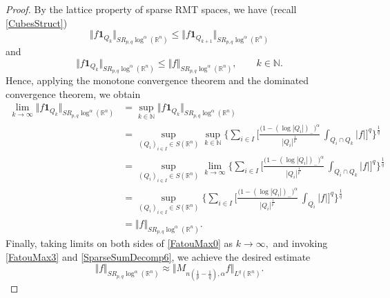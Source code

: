 \documentclass[10pt,a4paper]{amsart}
\begin{document}
\begin{proof}
By the lattice property of sparse RMT spaces, we have (recall
\eqref{CubesStruct})
\[
\Vert f\mathbf{1}_{Q_{k}}\Vert_{SR_{p,q}\log^{\alpha}(\mathbb{R}^{n})}%
\leq\Vert f\mathbf{1}_{Q_{k+1}}\Vert_{SR_{p,q}\log^{\alpha}(\mathbb{R}^{n})}%
\]
and
\[
\Vert f\mathbf{1}_{Q_{k}}\Vert_{SR_{p,q}\log^{\alpha}(\mathbb{R}^{n})}%
\leq\Vert f\Vert_{SR_{p,q}\log^{\alpha}(\mathbb{R}^{n})},\qquad k\in
\mathbb{N}.
\]
Hence, applying the monotone convergence theorem and the dominated convergence
theorem, we obtain
\begin{align}
\lim_{k\rightarrow\infty}\Vert f\mathbf{1}_{Q_{k}}\Vert_{SR_{p,q}\log^{\alpha
}(\mathbb{R}^{n})}  &  =\sup_{k\in\mathbb{N}}\Vert f\mathbf{1}_{Q_{k}}%
\Vert_{SR_{p,q}\log^{\alpha}(\mathbb{R}^{n})}\nonumber\\
&  =\sup_{(Q_{i})_{i\in I}\in S(\mathbb{R}^{n})}\sup
_{k\in\mathbb{N}}\bigg\{\sum_{i\in I}\bigg[\frac{\big(1-(\log|Q_{i}%
|)_{-}\big)^{\alpha}}{|Q_{i}|^{\frac{1}{p^{\prime}}}}\,\int_{Q_{i}\cap Q_{k}%
}|f|\bigg]^{q}\bigg\}^{\frac{1}{q}}\nonumber\\
&  =\sup_{(Q_{i})_{i\in I}\in S(\mathbb{R}^{n})}\lim
_{k\rightarrow\infty}\bigg\{\sum_{i\in I}\bigg[\frac{\big(1-(\log|Q_{i}%
|)_{-}\big)^{\alpha}}{|Q_{i}|^{\frac{1}{p^{\prime}}}}\,\int_{Q_{i}\cap Q_{k}%
}|f|\bigg]^{q}\bigg\}^{\frac{1}{q}}\label{SparseSumDecomp6}\\
&  =\sup_{(Q_{i})_{i\in I}\in S(\mathbb{R}^{n})}\bigg\{\sum
_{i\in I}\bigg[\frac{\big(1-(\log|Q_{i}|)_{-}\big)^{\alpha}}{|Q_{i}|^{\frac
{1}{p^{\prime}}}}\,\int_{Q_{i}}|f|\bigg]^{q}\bigg\}^{\frac{1}{q}}\nonumber\\
&  =\Vert f\Vert_{SR_{p,q}\log^{\alpha}(\mathbb{R}^{n}%
)}.\nonumber
\end{align}
Finally, taking limits on both sides of \eqref{FatouMax0} as $k\rightarrow
\infty,$ and invoking \eqref{FatouMax3} and \eqref{SparseSumDecomp6}, we
achieve the desired estimate
\[
\Vert f\Vert_{SR_{p,q}\log^{\alpha}(\mathbb{R}^{n})}\approx\Vert M_{n(\frac
{1}{p}-\frac{1}{q}),\alpha}f\Vert_{L^{q}(\mathbb{R}^{n})}.
\]

\end{proof}
\end{document}
